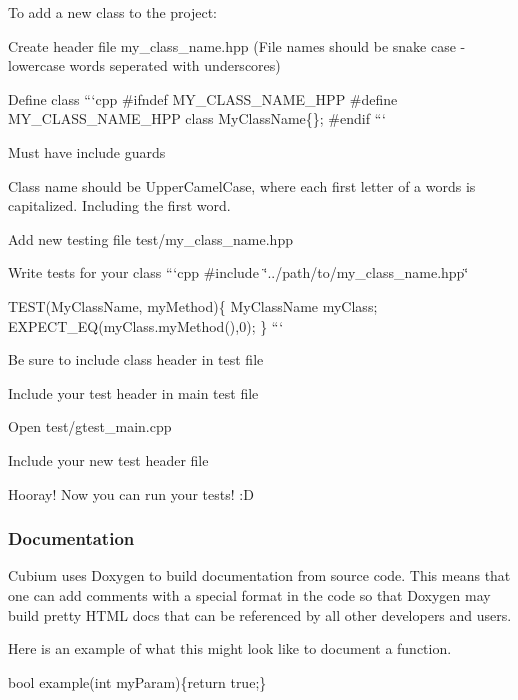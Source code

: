 To add a new class to the project\+:
\begin{DoxyItemize}
\item Create header file {\ttfamily my\+\_\+class\+\_\+name.\+hpp} (File names should be snake case -\/ lowercase words seperated with underscores)
\begin{DoxyItemize}
\item Define class ```cpp \#ifndef M\+Y\+\_\+\+C\+L\+A\+S\+S\+\_\+\+N\+A\+M\+E\+\_\+\+H\+PP \#define M\+Y\+\_\+\+C\+L\+A\+S\+S\+\_\+\+N\+A\+M\+E\+\_\+\+H\+PP class My\+Class\+Name\{\}; \#endif ```
\begin{DoxyItemize}
\item Must have include guards
\item Class name should be Upper\+Camel\+Case, where each first letter of a words is capitalized. Including the first word.
\end{DoxyItemize}
\end{DoxyItemize}
\item Add new testing file {\ttfamily test/my\+\_\+class\+\_\+name.\+hpp}
\item Write tests for your class ```cpp \#include \char`\"{}../path/to/my\+\_\+class\+\_\+name.\+hpp\char`\"{}

T\+E\+S\+T(\+My\+Class\+Name, my\+Method)\{ My\+Class\+Name my\+Class; E\+X\+P\+E\+C\+T\+\_\+\+EQ(my\+Class.\+my\+Method(),0); \} ```
\begin{DoxyItemize}
\item Be sure to include class header in test file
\end{DoxyItemize}
\item Include your test header in main test file
\begin{DoxyItemize}
\item Open {\ttfamily test/gtest\+\_\+main.\+cpp}
\item Include your new test header file
\end{DoxyItemize}
\item Hooray! Now you can run your tests! \+:D
\end{DoxyItemize}

\subsubsection*{Documentation}

Cubium uses Doxygen to build documentation from source code. This means that one can add comments with a special format in the code so that Doxygen may build pretty H\+T\+ML docs that can be referenced by all other developers and users.

Here is an example of what this might look like to document a function. 
\begin{DoxyCode}

\textcolor{keywordtype}{bool} example(\textcolor{keywordtype}{int} myParam)\{\textcolor{keywordflow}{return} \textcolor{keyword}{true};\}
\end{DoxyCode}
 